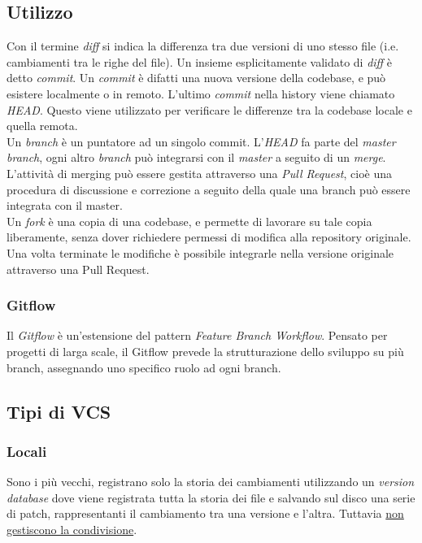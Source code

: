 \documentclass[10pt, a4paper]{article}
\begin{document}
\subsection{Utilizzo}
Con il termine \emph{diff} si indica la differenza tra due versioni di uno stesso file (i.e. cambiamenti tra le righe del file). Un insieme esplicitamente validato di \emph{diff} è detto \emph{commit}. Un \emph{commit} è difatti una nuova versione della codebase, e può esistere localmente o in remoto. L'ultimo \emph{commit} nella history viene chiamato \emph{HEAD}. Questo viene utilizzato per verificare le differenze tra la codebase locale e quella remota. \\
Un \emph{branch} è un puntatore ad un singolo commit. L'\emph{HEAD} fa parte del \emph{master branch}, ogni altro \emph{branch} può integrarsi con il \emph{master} a seguito di un \emph{merge}. \\
L'attività di merging può essere gestita attraverso una \emph{Pull Request}, cioè una procedura di discussione e correzione a seguito della quale una branch può essere integrata con il master. \\
Un \emph{fork} è una copia di una codebase, e permette di lavorare su tale copia liberamente, senza dover richiedere permessi di modifica alla repository originale. Una volta terminate le modifiche è possibile integrarle nella versione originale attraverso una Pull Request.
\subsubsection*{Gitflow}
Il \emph{Gitflow} è un'estensione del pattern \emph{Feature Branch Workflow}. Pensato per progetti di larga scale, il Gitflow prevede la strutturazione dello sviluppo su più branch, assegnando uno specifico ruolo ad ogni branch.
 
\subsection{Tipi di VCS}
\subsubsection*{Locali}
Sono i più vecchi, registrano solo la storia dei cambiamenti utilizzando un \textit{version database} dove viene registrata tutta la storia dei file e salvando sul disco una serie di patch, rappresentanti il cambiamento tra una versione e l'altra. Tuttavia \underline{non gestiscono la condivisione}.
\end{document}
